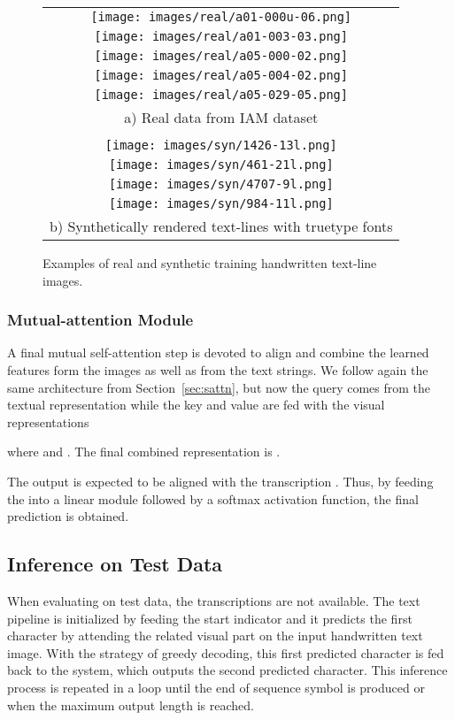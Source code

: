 \documentclass[10pt,twocolumn,letterpaper]{article}
\begin{document}
\begin{figure*}[t!h]
    \centering
    \begin{tabular}{c}
        \texttt{[image: images/real/a01-000u-06.png]}\\
         \texttt{[image: images/real/a01-003-03.png]}\\
         \texttt{[image: images/real/a05-000-02.png]}\\
         \texttt{[image: images/real/a05-004-02.png]}\\
         \texttt{[image: images/real/a05-029-05.png]}\\
         a) Real data from IAM dataset\\
         \\
\texttt{[image: images/syn/1426-13l.png]}\\
         \texttt{[image: images/syn/461-21l.png]}\\
         \texttt{[image: images/syn/4707-9l.png]}\\
         \texttt{[image: images/syn/984-11l.png]}\\
b) Synthetically rendered text-lines with truetype fonts \\
\end{tabular}
    \caption{Examples of real and synthetic training handwritten text-line images.}
    \label{fig:syn}
\end{figure*}


\subsubsection{Mutual-attention Module}
\label{sec:mattn}
A final mutual self-attention step is devoted to align and combine the learned features form the images as well as from the text strings. We follow again the same architecture from Section~\ref{sec:sattn}, but now the query  comes from the textual representation  while the key  and value  are fed with the visual representations 


where  and . The final combined representation is  .

The output  is expected to be aligned with the transcription . Thus, by feeding the  into a linear module followed by a softmax activation function, the final prediction is obtained. 



\subsection{Inference on Test Data}
When evaluating on test data, the transcriptions  are not available. The text pipeline is initialized by feeding the start indicator  and it predicts the first character by attending the related visual part on the input handwritten text image. With the strategy of greedy decoding, this first predicted character is fed back to the system, which outputs the second predicted character. This inference process is repeated in a loop until the end of sequence symbol  is produced or when the maximum output length  is reached. 
\end{document}
